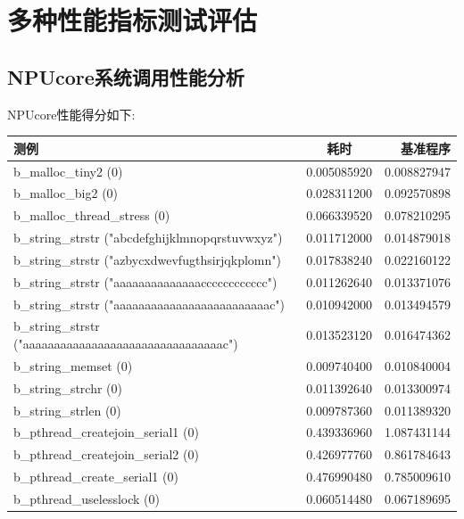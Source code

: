 \section{多种性能指标测试评估}

\subsection{NPUcore系统调用性能分析}

NPUcore性能得分如下:

\begin{table}[H]
    \centering
    \begin{tabular}{|l|c|r|}
        \hline
        \textbf{测例} & \textbf{耗时} & \textbf{基准程序} \\
        \hline
        b\_malloc\_tiny2 (0) & 0.005085920 & 0.008827947\\
        \hline
        b\_malloc\_big2 (0) & 0.028311200 & 0.092570898 \\
        \hline
        b\_malloc\_thread\_stress (0) & 0.066339520 & 0.078210295\\
        \hline
        b\_string\_strstr ("abcdefghijklmnopqrstuvwxyz") & 0.011712000 &0.014879018\\
        \hline
        b\_string\_strstr ("azbycxdwevfugthsirjqkplomn") & 0.017838240 &0.022160122\\
        \hline
        b\_string\_strstr ("aaaaaaaaaaaaaacccccccccccc") & 0.011262640 &0.013371076\\
        \hline
        b\_string\_strstr ("aaaaaaaaaaaaaaaaaaaaaaaaac") & 0.010942000 &0.013494579\\
        \hline
        b\_string\_strstr ("aaaaaaaaaaaaaaaaaaaaaaaaaaaaaaaac") & 0.013523120 &0.016474362\\
        \hline
        b\_string\_memset (0) & 0.009740400 &0.010840004\\
        \hline
        b\_string\_strchr (0) & 0.011392640 &0.013300974\\
        \hline
        b\_string\_strlen (0) & 0.009787360 &0.011389320\\
        \hline
        b\_pthread\_createjoin\_serial1 (0) & 0.439336960 &1.087431144\\
        \hline
        b\_pthread\_createjoin\_serial2 (0) & 0.426977760 &0.861784643\\
        \hline
        b\_pthread\_create\_serial1 (0) & 0.476990480 &0.785009610\\
        \hline
        b\_pthread\_uselesslock (0) & 0.060514480 &0.067189695\\

\end{tabular}
\end{table}
